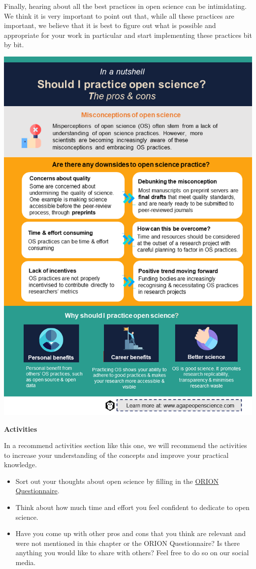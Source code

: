 \documentclass[
]{book}
\begin{document}
Finally, hearing about all the best practices in open science can be intimidating. We think it is very important to point out that, while all these practices are important, we believe that it is best to figure out what is possible and appropriate for your work in particular and start implementing these practices bit by bit.

\begin{center}\includegraphics[width=0.7\linewidth]{images/slide4} \end{center}

\textbf{Activities}

In a recommend activities section like this one, we will recommend the activities to increase your understanding of the concepts and improve your practical knowledge.

\begin{itemize}
\item
  Sort out your thoughts about open science by filling in the \href{https://www.orion-openscience.eu/public/2019-01/ORION_Questionaire_RPFO-CRECIM.pdf}{ORION Questionnaire}.
\item
  Think about how much time and effort you feel confident to dedicate to open science.
\item
  Have you come up with other pros and cons that you think are relevant and were not mentioned in this chapter or the ORION Questionnaire? Is there anything you would like to share with others? Feel free to do so on our social media.
\end{itemize}
\end{document}
